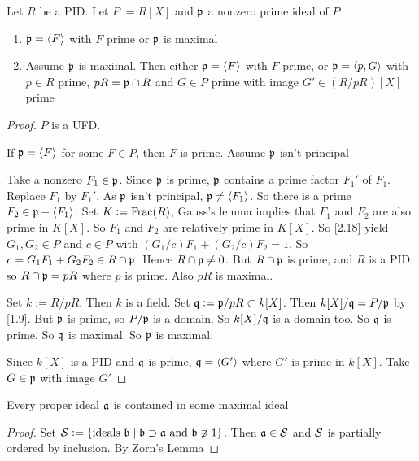 \documentclass[11pt]{article}
\begin{document}
\begin{theorem}[]
\label{2.20}
Let \(R\) be a PID. Let \(P:=R[X]\) and \(\mathfrak{p}\) a nonzero prime ideal of
\(P\)
\begin{enumerate}
\item \(\mathfrak{p}=\langle F\rangle\) with \(F\) prime or \(\mathfrak{p}\) is maximal
\item Assume \(\mathfrak{p}\) is maximal. Then either \(\mathfrak{p}=\langle F\rangle\) with \(F\) prime,
or \(\mathfrak{p}=\langle p,G\rangle\) with \(p\in R\) prime, \(pR=\mathfrak{p}\cap R\) and \(G\in
      P\) prime with image \(G'\in(R/pR)[X]\) prime
\end{enumerate}
\end{theorem}

\begin{proof}
\(P\) is a UFD.

If \(\mathfrak{p}=\langle F\rangle\) for some \(F\in P\), then \(F\) is prime. Assume \(\mathfrak{p}\)
isn't principal

Take a nonzero \(F_1\in\mathfrak{p}\). Since \(\mathfrak{p}\) is prime, \(\mathfrak{p}\) contains a
prime factor \(F_1'\) of \(F_1\). Replace \(F_1\) by \(F_1'\). As \(\mathfrak{p}\)
isn't principal, \(\mathfrak{p}\neq\langle F_1\rangle\). So there is a prime \(F_2\in\mathfrak{p}-\langle
   F_1\rangle\).
Set \(K:=\operatorname{Frac}(R)\), Gauss's lemma implies that \(F_1\) and \(F_2\) are also
prime in \(K[X]\). So \(F_1\) and \(F_2\) are relatively prime in \(K[X]\).
So \ref{2.18} yield \(G_1,G_2\in P\) and \(c\in P\) with
\((G_1/c)F_1+(G_2/c)F_2=1\). So \(c=G_1F_1+G_2F_2\in R\cap\mathfrak{p}\). Hence
\(R\cap\mathfrak{p}\neq0\). But \(R\cap\mathfrak{p}\) is prime, and \(R\) is a PID; so
\(R\cap\mathfrak{p}=pR\) where \(p\) is prime. Also \(pR\) is maximal.

Set \(k:=R/pR\). Then \(k\) is a field. Set \(\mathfrak{q}:=\mathfrak{p}/pR\subset k[X]\). Then
\(k[X]/\mathfrak{q}=P/\mathfrak{p}\) by \ref{1.9}. But \(\mathfrak{p}\) is prime, so \(P/\mathfrak{p}\) is a
domain. So \(k[X]/\mathfrak{q}\) is a domain too. So \(\mathfrak{q}\) is prime. So \(\mathfrak{q}\) is
maximal. So \(\mathfrak{p}\) is maximal.

Since \(k[X]\) is a PID and \(\mathfrak{q}\) is prime, \(\mathfrak{q}=\langle G'\rangle\) where \(G'\)
is prime in \(k[X]\). Take \(G\in\mathfrak{p}\)  with image \(G'\)
\end{proof}

\begin{theorem}[]
Every proper ideal \(\mathfrak{a}\) is contained in some maximal ideal
\end{theorem}

\begin{proof}
Set \(\mathcal{S}:=\{\text{ideals }\mathfrak{b}\mid\mathfrak{b}\supset\mathfrak{a}\text{ and }\mathfrak{b}\not\ni1\}\).
Then \(\mathfrak{a}\in\mathcal{S}\) and \(\mathcal{S}\) is partially ordered by inclusion. By
Zorn's Lemma
\end{proof}
\end{document}
